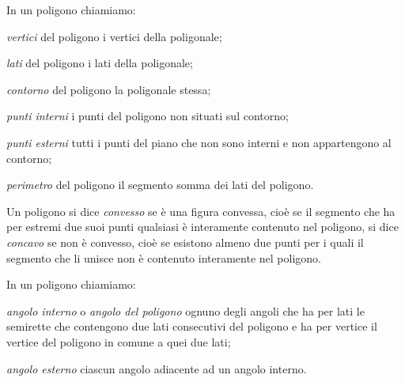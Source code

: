 \begin{definizione}
In un poligono chiamiamo:
\begin{itemize*}
\item \emph{vertici} del poligono i vertici della poligonale;
\item \emph{lati} del poligono i lati della poligonale;
\item \emph{contorno} del poligono la poligonale stessa;
\item \emph{punti interni} i punti del poligono non situati sul 
contorno;
\item \emph{punti esterni} tutti i punti del piano che non sono 
interni e non appartengono al contorno;
\item \emph{perimetro} del poligono il segmento somma dei lati del 
poligono.
\end{itemize*}
\end{definizione}

\begin{definizione}
Un poligono si dice \emph{convesso} se è una figura convessa, cioè se 
il segmento che ha per estremi due suoi punti qualsiasi è interamente 
contenuto nel poligono, si dice \emph{concavo} se non è convesso, 
cioè se esistono almeno due punti per i quali il segmento che li 
unisce non è contenuto interamente nel poligono.
\end{definizione}


\begin{inaccessibleblock}
\begin{center}\end{center}
\end{inaccessibleblock}

\begin{definizione}
In un poligono chiamiamo:
\begin{itemize*}
\item \emph{angolo interno} o \emph{angolo del poligono} ognuno degli 
angoli che ha per lati le semirette che contengono due lati 
consecutivi del poligono e ha per vertice il vertice del poligono in 
comune a quei due lati;
\item \emph{angolo esterno} ciascun angolo adiacente ad un angolo 
interno.
\end{itemize*}
\end{definizione}


